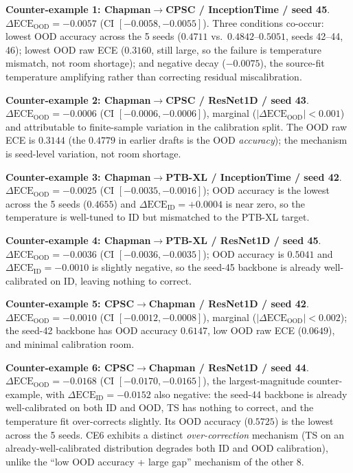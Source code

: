 \documentclass[review,12pt,nonatbib]{elsarticle}
\begin{document}
\textbf{Counter-example 1: Chapman$\rightarrow$CPSC / InceptionTime / seed 45}.
$\Delta\text{ECE}_{\text{OOD}}=-0.0057$ (CI $[-0.0058, -0.0055]$). Three
conditions co-occur: lowest OOD accuracy across the 5 seeds ($0.4711$
vs.\ $0.4842$--$0.5051$, seeds 42--44, 46); lowest OOD raw ECE
($0.3160$, still large, so the failure is temperature mismatch, not room
shortage); and negative decay ($-0.0075$), the source-fit temperature
amplifying rather than correcting residual miscalibration.

\textbf{Counter-example 2: Chapman$\rightarrow$CPSC / ResNet1D / seed 43}.
$\Delta\text{ECE}_{\text{OOD}}=-0.0006$ (CI $[-0.0006, -0.0006]$), marginal
($|\Delta\text{ECE}_{\text{OOD}}|<0.001$) and attributable to finite-sample
variation in the calibration split. The OOD raw ECE is $0.3144$ (the
$0.4779$ in earlier drafts is the OOD \emph{accuracy}); the mechanism is
seed-level variation, not room shortage.

\textbf{Counter-example 3: Chapman$\rightarrow$PTB-XL / InceptionTime / seed 42}.
$\Delta\text{ECE}_{\text{OOD}}=-0.0025$ (CI $[-0.0035, -0.0016]$); OOD
accuracy is the lowest across the 5 seeds ($0.4655$) and
$\Delta\text{ECE}_{\text{ID}}=+0.0004$ is near zero, so the temperature is
well-tuned to ID but mismatched to the PTB-XL target.

\textbf{Counter-example 4: Chapman$\rightarrow$PTB-XL / ResNet1D / seed 45}.
$\Delta\text{ECE}_{\text{OOD}}=-0.0036$ (CI $[-0.0036, -0.0035]$); OOD
accuracy is $0.5041$ and $\Delta\text{ECE}_{\text{ID}}=-0.0010$ is slightly
negative, so the seed-45 backbone is already well-calibrated on ID,
leaving nothing to correct.

\textbf{Counter-example 5: CPSC$\rightarrow$Chapman / ResNet1D / seed 42}.
$\Delta\text{ECE}_{\text{OOD}}=-0.0010$ (CI $[-0.0012, -0.0008]$), marginal
($|\Delta\text{ECE}_{\text{OOD}}|<0.002$); the seed-42 backbone has OOD
accuracy $0.6147$, low OOD raw ECE ($0.0649$), and minimal calibration
room.

\textbf{Counter-example 6: CPSC$\rightarrow$Chapman / ResNet1D / seed 44}.
$\Delta\text{ECE}_{\text{OOD}}=-0.0168$ (CI $[-0.0170, -0.0165]$), the
largest-magnitude counter-example, with
$\Delta\text{ECE}_{\text{ID}}=-0.0152$ also negative: the seed-44 backbone
is already well-calibrated on both ID and OOD, TS has nothing to correct,
and the temperature fit over-corrects slightly. Its OOD
accuracy ($0.5725$) is the lowest across the 5 seeds. CE6 exhibits a
distinct \emph{over-correction} mechanism (TS on an already-well-calibrated
distribution degrades both ID and OOD calibration), unlike the ``low OOD
accuracy + large gap'' mechanism of the other 8.
\end{document}
